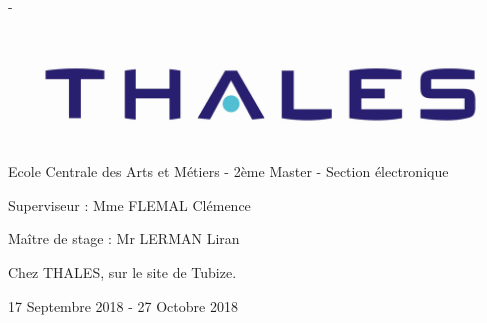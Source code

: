 \begin{titlingpage}
\begin{SingleSpace}
\begin{adjustwidth*}{\unitlength}{-\unitlength}
\begin{center}
\includegraphics[scale=0.3]{logos/Logo-Thales.jpg}\\
\vspace{6mm}
{\large Ecole Centrale des Arts et Métiers - 2ème Master - Section électronique}\\

\vspace{11mm}
      \begin{flushleft} \large
        Superviseur : Mme FLEMAL Clémence

        Maître de stage : Mr LERMAN Liran \\
      \end{flushleft}
\vspace{9mm}

{Chez THALES, sur le site de Tubize.}
\vspace{12mm}
\end{center}

\begin{flushright}
{\small {17 Septembre 2018 - 27 Octobre 2018}}
\end{flushright}

\end{adjustwidth*}
\end{SingleSpace}
\end{titlingpage}